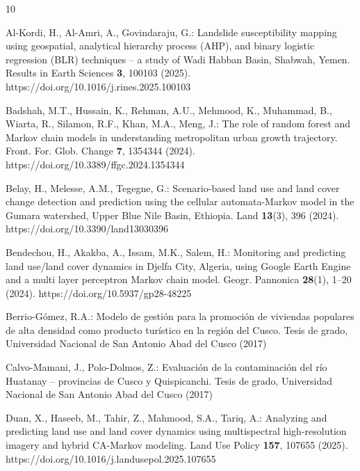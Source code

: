 \documentclass[runningheads]{llncs}
\begin{document}

\begin{thebibliography}{10}
\providecommand{\url}[1]{\texttt{#1}}
\providecommand{\urlprefix}{URL }
\providecommand{\doi}[1]{https://doi.org/#1}

Al-Kordi, H., Al-Amri, A., Govindaraju, G.: Landslide susceptibility mapping
  using geospatial, analytical hierarchy process (AHP), and binary logistic
  regression (BLR) techniques -- a study of Wadi Habban Basin, Shabwah, Yemen.
  Results in Earth Sciences \textbf{3}, 100103 (2025).
  \doi{10.1016/j.rines.2025.100103}

Badshah, M.T., Hussain, K., Rehman, A.U., Mehmood, K., Muhammad, B., Wiarta,
  R., Silamon, R.F., Khan, M.A., Meng, J.: The role of random forest and Markov
  chain models in understanding metropolitan urban growth trajectory. Front.
  For. Glob. Change \textbf{7}, 1354344 (2024).
  \doi{10.3389/ffgc.2024.1354344}

Belay, H., Melesse, A.M., Tegegne, G.: Scenario-based land use and land cover
  change detection and prediction using the cellular automata-Markov model in
  the Gumara watershed, Upper Blue Nile Basin, Ethiopia. Land \textbf{13}(3),
  396 (2024). \doi{10.3390/land13030396}

Bendechou, H., Akakba, A., Issam, M.K., Salem, H.: Monitoring and predicting
  land use/land cover dynamics in Djelfa City, Algeria, using Google Earth
  Engine and a multi layer perceptron Markov chain model. Geogr. Pannonica
  \textbf{28}(1), 1--20 (2024). \doi{10.5937/gp28-48225}

Berrio-G{\'o}mez, R.A.: Modelo de gesti{\'o}n para la promoci{\'o}n de viviendas
  populares de alta densidad como producto tur{\'i}stico en la regi{\'o}n del
  Cusco. Tesis de grado, Universidad Nacional de San Antonio Abad del Cusco (2017)

Calvo-Mamani, J., Polo-Dolmos, Z.: Evaluaci{\'o}n de la contaminaci{\'o}n del
  r{\'i}o Huatanay -- provincias de Cusco y Quispicanchi. Tesis de grado,
  Universidad Nacional de San Antonio Abad del Cusco (2017)

Duan, X., Haseeb, M., Tahir, Z., Mahmood, S.A., Tariq, A.: Analyzing and
  predicting land use and land cover dynamics using multispectral high-resolution
  imagery and hybrid CA-Markov modeling. Land Use Policy \textbf{157},
  107655 (2025). \doi{10.1016/j.landusepol.2025.107655}


\end{thebibliography}
\end{document}
